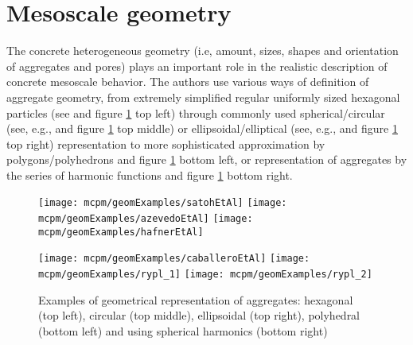 \section{Mesoscale geometry}
The concrete heterogeneous geometry (i.e, amount, sizes, shapes and orientation of aggregates and pores) plays an important role in the realistic description of concrete meso\-scale behavior.
The authors use various ways of definition of aggregate geometry, from extremely simplified regular uniformly sized hexagonal particles (see \cite{SatohYamadaIshiyama2013a} and figure \ref{figMCPMLitratureMesoGeometryExamples} top left)
through commonly used spherical/circular (see, e.g.,
\cite{%
	AzevedoLemosAlmeida2008a,%
	CombypeyrotBernardBouchardBayGarciadiaz2009a,%
	PedersenSimoneSluys2013a,%
	ShahbeykHosseiniYaghoobi2011a,%
	WangLinGu2008a,%
	WriggersMoftah2006,%
	XuHaoLi2012a,%
	ZhouHao2008a,%
	ZhouHao2008b,%
	ZhouHao2009a,%
	KimAlrub2011a,%
	GuHongWangLin2013a,%
	GrasslJirasek2010a,%
	GrasslRempling2008a,%
	YipLiLiaoBolander2006a,%
	Marangi2010a,%
	Kozicki2007a,%
	NeubauerLenningsGarboczi1996a,%
	LandisBolander2009a,%
	AsahinaLandisBolander2011a%
} and figure \ref{figMCPMLitratureMesoGeometryExamples} top middle) or ellipsoidal/elliptical (see, e.g.,
\cite{%
	GrohKonietzkyWalterHerbst2011a,%
	HafnerEckardtLutherKonke2006a,%
	LeiteSlowikApel2007a,%
	LeiteSlowikMihashi2004a,%
	SnozziGatuingtMolinari2012a,%
	KimAlrub2011a%
} and figure \ref{figMCPMLitratureMesoGeometryExamples} top right) representation to more sophisticated approximation by polygons/polyhedrons
\cite{%
	KwanWangChan1999b,%
	PanFengJinXuSunZhangOwen2013a,%
	PedersenSimoneSluys2013a,%
	KimAlrub2011a,%
	QinZhang2011a,%
	ZhuTang2002a%
} and figure \ref{figMCPMLitratureMesoGeometryExamples} bottom left,
or representation of aggregates by the series of harmonic functions
\cite{%
	Garboczi2002a,%
	HafnerEckardtLutherKonke2006a,%
	Rypl2010a%
} and figure \ref{figMCPMLitratureMesoGeometryExamples} bottom right.
\begin{figure}[ht]
	\centering
	\texttt{[image: mcpm/geomExamples/satohEtAl]}
	\hspace{10mm}
	\texttt{[image: mcpm/geomExamples/azevedoEtAl]}
	\hspace{10mm}
	\texttt{[image: mcpm/geomExamples/hafnerEtAl]}
	\par
	\vspace{2mm}
	\texttt{[image: mcpm/geomExamples/caballeroEtAl]}
	\hspace{20mm}
	\texttt{[image: mcpm/geomExamples/rypl\_1]}
	\texttt{[image: mcpm/geomExamples/rypl\_2]}
	\caption[Examples of geometrical representation of aggregates]{Examples of geometrical representation of aggregates:
		hexagonal \cite{SatohYamadaIshiyama2013a} (top left),
		circular \cite{AzevedoLemosAlmeida2008a} (top middle),
		ellipsoidal \cite{HafnerEckardtLutherKonke2006a} (top right),
		polyhedral \cite{CaballeroWillamCarol2008a} (bottom left)
		and using spherical harmonics \cite{Rypl2010a} (bottom right)
	}
	\label{figMCPMLitratureMesoGeometryExamples}
\end{figure}

